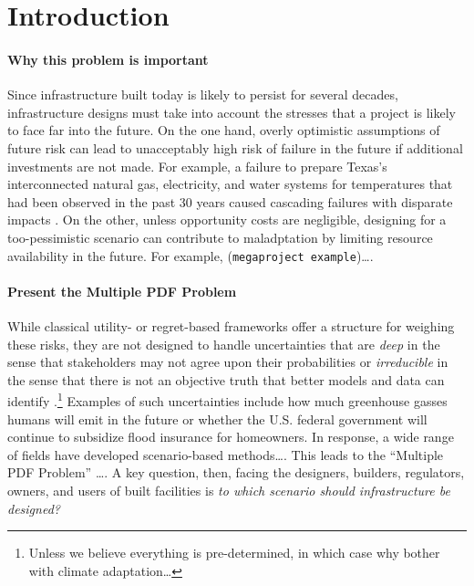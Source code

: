 \documentclass[12pt]{article}
\begin{document}
\clearpage
\section{Introduction}

\paragraph{Why this problem is important}
Since infrastructure built today is likely to persist for several decades, infrastructure designs must take into account the stresses that a project is likely to face far into the future.
On the one hand, overly optimistic assumptions of future risk can lead to unacceptably high risk of failure in the future if additional investments are not made.
For example, a failure to prepare Texas's interconnected natural gas, electricity, and water systems for temperatures that had been observed in the past 30 years caused cascading failures with disparate impacts \citep{doss-gollin_txtreme:2021}.
On the other, unless opportunity costs are negligible, designing for a too-pessimistic scenario can contribute to maladptation by limiting resource availability in the future.
For example, (\texttt{megaproject example})\ldots.

\paragraph{Present the Multiple PDF Problem}
While classical utility- or regret-based frameworks offer a structure for weighing these risks, they are not designed to handle uncertainties that are \emph{deep} in the sense that stakeholders may not agree upon their probabilities \citep{lempert_complex:2002} or \emph{irreducible} in the sense that there is not an objective truth that better models and data can identify \citep{DossGollin:2019}.\footnote{Unless we believe everything is pre-determined, in which case why bother with climate adaptation\ldots}
Examples of such uncertainties include how much greenhouse gasses humans will emit in the future or whether the U.S. federal government will continue to subsidize flood insurance for homeowners.
In response, a wide range of fields have developed scenario-based methods\ldots.
This leads to the ``Multiple PDF Problem'' \citep{sharma_rcp:2021}\ldots.
A key question, then, facing the designers, builders, regulators, owners, and users of built facilities is \emph{to which scenario should infrastructure be designed?}
\end{document}
